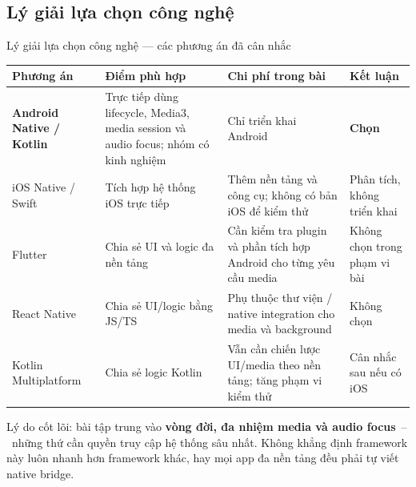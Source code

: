 \subsection{Lý giải lựa chọn công nghệ}
\begin{frame}{Lý giải lựa chọn công nghệ --- các phương án đã cân nhắc}
\begin{center}\tiny
\setlength{\tabcolsep}{3pt}
\begin{tabular}{@{}p{2.4cm}p{4.6cm}p{4.0cm}p{2.4cm}@{}}
\toprule
\textbf{Phương án} & \textbf{Điểm phù hợp} & \textbf{Chi phí trong bài} & \textbf{Kết luận} \\
\midrule
\textbf{Android Native / Kotlin} & Trực tiếp dùng lifecycle, Media3, media session và audio focus; nhóm có kinh nghiệm & Chỉ triển khai Android & \textbf{Chọn} \\
iOS Native / Swift & Tích hợp hệ thống iOS trực tiếp & Thêm nền tảng và công cụ; không có bản iOS để kiểm thử & Phân tích, không triển khai \\
Flutter & Chia sẻ UI và logic đa nền tảng & Cần kiểm tra plugin và phần tích hợp Android cho từng yêu cầu media & Không chọn trong phạm vi bài \\
React Native & Chia sẻ UI/logic bằng JS/TS & Phụ thuộc thư viện / native integration cho media và background & Không chọn \\
Kotlin Multiplatform & Chia sẻ logic Kotlin & Vẫn cần chiến lược UI/media theo nền tảng; tăng phạm vi kiểm thử & Cân nhắc sau nếu có iOS \\
\bottomrule
\end{tabular}
\end{center}
\vspace{1.2mm}
{\tiny\color{TextGray} Lý do cốt lõi: bài tập trung vào \textbf{vòng đời, đa nhiệm media và audio focus}~--~những thứ cần quyền truy cập hệ thống sâu nhất. Không khẳng định framework này luôn nhanh hơn framework khác, hay mọi app đa nền tảng đều phải tự viết native bridge.}
\end{frame}

